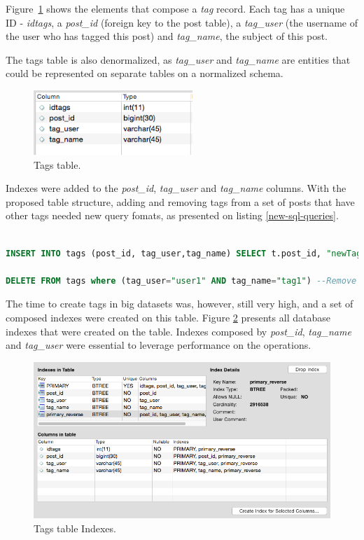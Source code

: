 Figure~\ref{fig:tagTable} shows the elements that compose a \textit{tag} record. Each tag has a unique ID - \textit{idtags}, a \textit{post\_id} (foreign key to the post table), a \textit{tag\_user} (the username of the user who has tagged this post) and \textit{tag\_name}, the subject of this post. 

The tags table is also denormalized, as \textit{tag\_user} and \textit{tag\_name} are entities that could be represented on separate tables on a normalized schema.

\begin{figure}[ht!]
\centering
\includegraphics[width=60mm]{tagTable.png}
\caption{Tags table.\label{fig:tagTable}}
\end{figure}

Indexes were added to the \textit{post\_id}, \textit{tag\_user} and \textit{tag\_name} columns. With the proposed table structure, adding and removing tags from a set of posts that have other tags needed new query fomats, as presented on listing \ref{new-sql-queries}.

\begin{lstlisting}[language=SQL,firstnumber=1, caption=New SQL queries to add and remove tags, label=new-sql-queries]

INSERT INTO tags (post_id, tag_user,tag_name) SELECT t.post_id, "newTagUser", "newTagName" from tags t where (t.tag_user= "user1" and t.tag_name="tag1") OR (t.tag_user="user2" and t.tag_name="tag2") -- Create tags 

DELETE FROM tags where (tag_user="user1" AND tag_name="tag1") --Remove Tags

\end{lstlisting} 


The time to create tags in big datasets was, however, still very high, and a set of composed indexes were created on this table. Figure \ref{fig:tagsIndexes} presents all database indexes that were created on the table. Indexes composed by \textit{post\_id}, \textit{tag\_name} and \textit{tag\_user} were essential to leverage performance on the operations. 

\begin{figure}[ht!]
\centering
\includegraphics[width=120mm]{Imagens/tagsIndexes.png}
\caption{Tags table Indexes. \label{fig:tagsIndexes}}
\end{figure}

